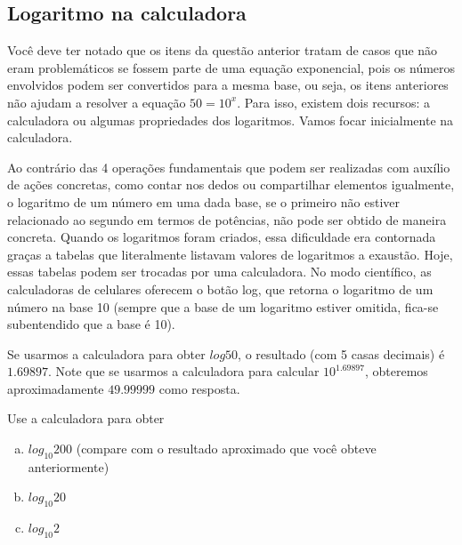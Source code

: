 \documentclass[main.tex]{subfiles}
\begin{document}
\subsection*{Logaritmo na calculadora}

Você deve ter notado que os itens da questão anterior tratam de casos que não eram problemáticos se fossem parte de uma equação exponencial, pois os números envolvidos podem ser convertidos para a mesma base, ou seja, os itens anteriores não ajudam a resolver a equação $50=10^x$. Para isso, existem dois recursos: a calculadora ou algumas propriedades dos logaritmos. Vamos focar inicialmente na calculadora.

Ao contrário das 4 operações fundamentais que podem ser realizadas com auxílio de ações concretas, como contar nos dedos ou compartilhar elementos igualmente, o logaritmo de um número em uma dada base, se o primeiro não estiver relacionado ao segundo em termos de potências, não pode ser obtido de maneira concreta. Quando os logaritmos foram criados, essa dificuldade era contornada graças a tabelas que literalmente listavam valores de logaritmos a exaustão. Hoje, essas tabelas podem ser trocadas por uma calculadora. No modo científico, as calculadoras de celulares oferecem o botão log, que retorna o logaritmo de um número na base 10 (sempre que a base de um logaritmo estiver omitida, fica-se subentendido que a base é 10).

Se usarmos a calculadora para obter $log 50$, o resultado (com 5 casas decimais) é $1.69897$. Note que se usarmos a calculadora para calcular $10^1.69897$, obteremos aproximadamente $49.99999$ como resposta.

\begin{questao}
 Use a calculadora para obter
\begin{enumerate}[a)]
\item $log_{10} 200$ (compare com o resultado aproximado que você obteve anteriormente)
\item $log_{10} 20$
\item $log_{10} 2$
\end{enumerate}
\end{questao}
\end{document}
